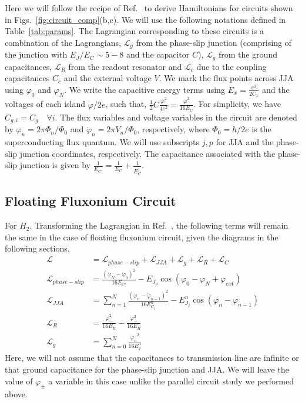 \documentclass[%
reprint,
superscriptaddress,
 amsmath,amssymb,
 aps,
 prx,
longbibliography,
floatfix,
]{revtex4-2}
\begin{document}
Here we will follow the recipe of Ref.~\cite{viola2015collective} to derive Hamiltonians for circuits shown in Figs.~\ref{fig:circuit_comp}(b,c). We will use the following notations defined in Table~\ref{tab:params}. The Lagrangian corresponding to these circuits is a combination of the Lagrangians, $\mathcal{L}_g$ from the phase-slip junction (comprising of the junction with $E_J/E_C\sim 5-8$ and the capacitor $C$), $\mathcal{L}_{g}$ from the ground capacitances, $\mathcal{L}_{R}$ from the readout resonator and $\mathcal{L}_c$ due to the coupling capacitances $C_c$ and the external voltage $V$. We mark the flux points across JJA using $\varphi_0$ and $\varphi_{N}$. We write the capacitive energy terms using $E_x=\frac{e^2}{2C_x}$ and the voltages of each island $\dot{\varphi}/2e$, such that, $\frac{1}{2}C\frac{\dot{\varphi}^2}{4e^2}=\frac{\dot{\varphi}^2}{16E_C}$. For simplicity, we have $C_{g,i}=C_g\quad\forall i$. The flux variables and voltage variables in the circuit are denoted by $\varphi_n=2\pi\Phi_n/\Phi_0$ and $\dot{\varphi}_n=2\pi V_n/\Phi_0$, respectively, where $\Phi_0=h/2e$ is the superconducting flux quantum. We will use subscripts $j, p$ for JJA and the phase-slip junction coordinates, respectively. The capacitance associated with the phase-slip junction is given by $\frac{1}{E_{C'}}=\frac{1}{E_C}+\frac{1}{E^{j}_{C}}$.

\subsection{Floating Fluxonium Circuit}
For $H_2$, Transforming the Lagrangian in Ref.~\cite{viola2015collective}, the following terms will remain the same in the case of floating fluxonium circuit, given the diagrams in the following sections.
\begin{align}
    \mathcal{L}&=\mathcal{L}_{phase-slip}+\mathcal{L}_{JJA}+\mathcal{L}_{g}+\mathcal{L}_{R}+\mathcal{L}_{C}\\
    \mathcal{L}_{phase-slip}&=\frac{(\dot{\varphi}_N-\dot{\varphi}_0)^2}{16E_{C'}}-E_{J_p}\cos(\varphi_0-\varphi_{N}+\varphi_{ext})\\
    \mathcal{L}_{JJA}&=\sum_{n=1}^N\frac{(\dot{\varphi}_n-\dot{\varphi}_{n-1})^2}{16E^{n}_{C_j}}-E^{n}_{J_j}\cos(\varphi_n-\varphi_{n-1})\\
    \mathcal{L}_{R}&=\frac{\dot{\varphi}_{-}^2}{16E_{{R}}}-\frac{\varphi_{-}^2}{16E_{R}}\\
    \mathcal{L}_{g}&=\sum_{n=0}^N \frac{\dot{\varphi_n}^2}{16E^n_{g}}\label{eq:float-float}
  \end{align}
  Here, we will not assume that the capacitances to transmission line are infinite or that ground capacitance for the phase-slip junction and JJA. We will leave the value of $\varphi_{\pm}$ a variable in this case unlike the parallel circuit study we performed above.
\end{document}
